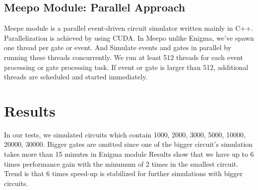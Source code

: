 \documentclass[a4paper,onesided,12pt]{report}
\begin{document}
\section{Meepo Module: Parallel Approach}
Meepe module is a parallel event-driven circuit simulator written mainly in C++. Parallelization is achieved by using CUDA. In Meepo unlike Enigma, we've spawn one thread per gate or event. And Simulate events and gates in parallel by running these threads concurrently. We run at least 512 threads for each event processing or gate processing task. If event or gate is larger than 512, additional threads are scheduled and started immediately.
\chapter{Results}
In our tests, we simulated circuits which contain 1000, 2000, 3000, 5000, 10000, 20000, 30000. Bigger gates are omitted since one of the bigger circuit's simulation takes more than 15 minutes in Enigma module Results show that we have up to 6 times performance gain with the minumum of 2 times in the smallest circuit. Trend is that 6 times speed-up is stabilized for further simulations with bigger circuits.
\end{document}
